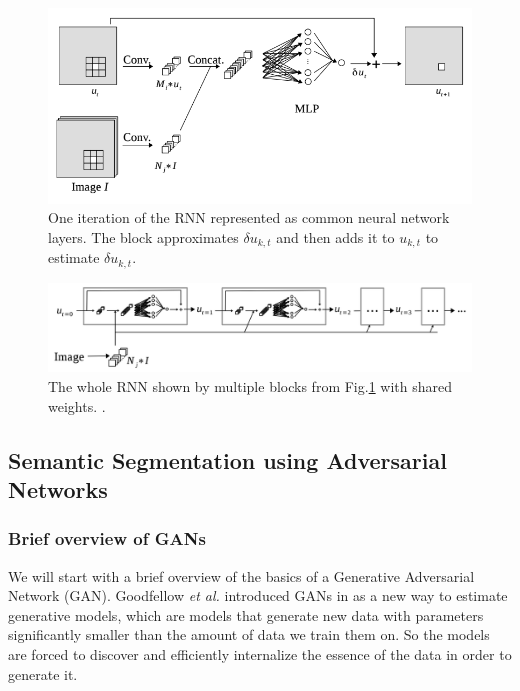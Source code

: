\begin{figure}[h!]
	\centering
		\includegraphics[width=1.0\textwidth]{figures/cnnrnn1.png}
	\caption{One iteration of the RNN represented as common neural network layers. The block approximates $\delta u_{k,t}$ and then adds it to $u_{k,t}$ to estimate $\delta u_{k,t}$. \cite{maggiori2016learning}}
	\label{f:cnnrnn1}
\end{figure}
\begin{figure}[h!]
	\centering
		\includegraphics[width=1.0\textwidth]{figures/cnnrnn2.png}
	\caption{The whole RNN shown by multiple blocks from Fig.\ref{f:cnnrnn1} with shared weights. \cite{maggiori2016learning}.}
	\label{f:cnnrnn2}
\end{figure}


\subsection{Semantic Segmentation using Adversarial Networks}
\subsubsection{Brief overview of GANs}
We will start with a brief overview of the basics of a Generative Adversarial Network (GAN). Goodfellow \textit{et al.} introduced GANs in \cite{goodfellow2014generative} as a new way to estimate generative models, which are models that generate new data with parameters significantly smaller than the amount of data we train them on. So the models are forced to discover and efficiently internalize the essence of the data in order to generate it. 

